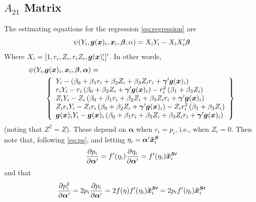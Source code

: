 \documentclass[]{article}
\begin{document}
\subsection{$A_{21}$ Matrix}
The estimating equations for the regression \eqref{eq:regression} are
\begin{equation}\label{eq:eeOLS}
  \psi(Y_i,\bm{g}(\bm{x})_i,\bm{x}_i,\bm{\beta},\alpha)=X_iY_i-X_iX_i'\bm{\beta}
\end{equation}
Where $X_i=[1,r_i,Z_i,r_iZ_i,\bm{g}(\bm{x})^\prime_i]'$.
In other words,
\begin{align*}
  \psi(Y_i,&\bm{g}(\bm{x})_i,\bm{x}_i,\bm{\beta},\bm{\alpha})=\\
  &\left\{
  \begin{array}{l}
    Y_i-\left(\beta_0+\beta_1r_i+\beta_2Z_i+\beta_3Z_ir_i+\bm{\gamma}'\bm{g}(\bm{x})_i\right)\\
    r_iY_i-r_i\left(\beta_0+\beta_2Z_i+\bm{\gamma}'\bm{g}(\bm{x})_i\right)-r_i^2\left(\beta_1+\beta_3Z_i\right)\\
    Z_iY_i-Z_i\left(\beta_0+\beta_1r_i+\beta_2Z_i+\beta_3Z_ir_i+\bm{\gamma}'\bm{g}(\bm{x})_i\right)\\
    Z_ir_iY_i-Z_ir_i\left(\beta_0+\beta_2Z_i+\bm{\gamma}'\bm{g}(\bm{x})_i\right)-Z_ir_i^2\left(\beta_1+\beta_3Z_i\right)\\
    \bm{g}(\bm{x})_iY_i-\bm{g}(\bm{x})_i\left(\beta_0+\beta_1r_i+\beta_2Z_i+\beta_3Z_ir_i+\bm{\gamma}'\bm{g}(\bm{x})_i\right)
  \end{array}
  \right\}
\end{align*}
(noting that $Z^2=Z$).
These depend on $\bm{\alpha}$ when $r_i=p_i$, i.e., when $Z_i=0$.%
Then note that, following \eqref{eq:ps}, and letting $\eta_i=\bm{\alpha}'\bm{\tilde{x}^S}_i$
\begin{equation}\label{eq:derivP}
  \frac{\partial p_i}{\partial \bm{\alpha}'}=f'(\eta_i)\frac{\partial \eta_i}{\partial \bm{\alpha}'}=f'(\eta_i)\bm{\tilde{x}^{S\prime}}_i
\end{equation}
and that
\begin{equation}
  \frac{\partial p_i^2}{\partial \bm{\alpha}'}=2p_i\frac{\partial p_i}{\partial \bm{\alpha}'}=2f(\eta)f'(\eta_i)\bm{\tilde{x}^{S\prime}}_i=2p_if'(\eta_i)\bm{\tilde{x}^{S\prime}}_i
\end{equation}
\end{document}

